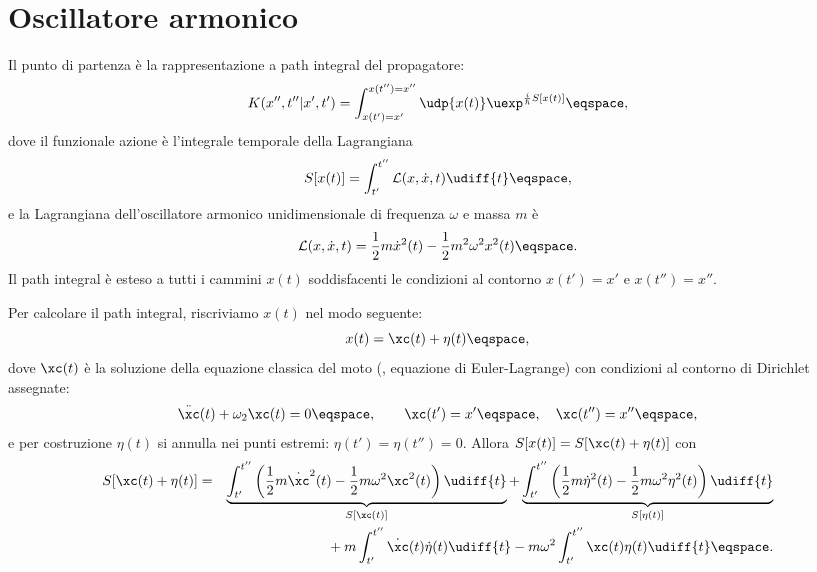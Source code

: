 \section{Oscillatore armonico}
Il punto di partenza \`e la rappresentazione a path integral del propagatore:
\begin{displaymath}
K(x'', t'' | x' ,t') = \int_{x(t') = x'}^{x(t'') =x''} \udp{x(t)} \uexp^{
\frac{i}{\hbar} S[x(t)] } \eqspace, 
\end{displaymath}
dove il funzionale azione \`e l'integrale temporale della Lagrangiana
\begin{displaymath}
S[x(t) ] = \int_{t'}^{t'' } \mathcal{L} (x, \dot{x}  ,t) \udiff{t}
\eqspace, 
\end{displaymath}
e la Lagrangiana dell'oscillatore armonico unidimensionale di frequenza $\omega$
e massa $m$ \`e
\begin{displaymath}
\mathcal{L} (x, \dot{x} , t) = \frac{1}{2} m \dot{x}^{2} (t) - \frac{1}{2} m^{2}
\omega^{2} x^{2} (t)\eqspace .
\end{displaymath}
Il path integral \`e esteso a tutti i cammini $x(t)$ soddisfacenti le condizioni
al contorno $x(t') = x'$
e $x(t'')=x''$.
\par
Per calcolare il path integral, riscriviamo  $x(t)$ nel modo seguente:
\begin{displaymath}
x(t) = \xc(t) + \eta(t) \eqspace, 
\end{displaymath}
dove $\xc(t)$ \`e la soluzione della equazione classica del moto (\ie,
equazione di Euler-Lagrange) con condizioni al contorno di Dirichlet assegnate:
\begin{equation}\label{eq:xceq}
\ddot{\xc} (t) + \omega_{2} \xc (t) = 0 \eqspace, \qquad \xc(t') = x'\eqspace ,\quad
\xc(t'') =x'' \eqspace ,
\end{equation}
e per costruzione $\eta(t)$ si annulla nei punti estremi:
$\eta(t') = \eta(t'') = 0$.
Allora $S[x(t)] = S[\xc(t) + \eta(t)]$ con
\begin{eqnarray*}
S[\xc(t) + \eta(t)] &=& 
 \underbrace{ \int_{t'}^{t''} \left( \frac{1}{2} m \dot{\xc}^{2} (t) -
\frac{1}{2} m\omega^{2} \xc^{2} (t) \right) \udiff{t} }_{S[\xc(t)]} + \underbrace{
\int_{t'}^{t''} \left( \frac{1}{2} m \dot{\eta}^{2} (t) - \frac{1}{2} m  \omega^{2}
\eta^{2} (t) \right) \udiff{t} } _{S[\eta(t)]}  \\
&&{}+ 
m \int_{t'}^{t''}  \dot{\xc} (t) \dot{\eta} (t) \udiff{t} - m\omega^{2} \int_{t'}^{t''}
\xc (t) \eta (t) \udiff{t} \eqspace .
\end{eqnarray*}
